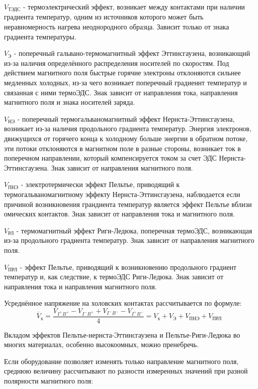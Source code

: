 $V_{\text{ТЭДС}}$ - термоэлектрический эффект, возникает между контактами при наличии градиента температур, одним из источников которого может быть неравномерность нагрева неоднородного образца. Зависит только от знака градиента температуры.

$V_{\text{Э}}$ - поперечный гальвано-термомагнитный эффект Эттинсгаузена, возникающий из-за наличия определённого распределения носителей по скоростям. Под действием магнитного поля быстрые горячие электроны отклоняются сильнее медленных холодных, из-за чего возникает поперечный градиеннт температур и связанная с ними термоЭДС. Знак зависит от направления тока, направления магнитного поля и знака носителей заряда.

$V_{\text{НЭ}}$ - поперечный термогальваномагнитный эффект Нернста-Эттинсгаузена, возникает из-за наличия продольного градиента температур. Энергия электронов, движущихся от горячего конца к холодному больше энергии в обратном потоке, эти потоки отклоняются в магнитном поле в разные стороны, возникает ток в поперечном направлении, который компенсируется током за счет ЭДС Нернста-Эттинсгаузена. Знак зависит от направления магнитного поля.

$V_{\text{ПНЭ}}$ - электротермически эффект Пельтье, приводящий к термогальваномагнитному эффекту Нернста-Эттинсгаузена, наблюдается если причиной возникновения грандиента температур является эффект Пельтье вблизи омических контактов. Знак зависит от направления тока и магнитного поля.

$V_{\text{РЛ}}$ - термомагнитный эффект Риги-Ледюка, поперечная термоЭДС, возникающая из-за продольного градиента температур. Знак зависит от направления магнитного поля.

$V_{\text{ПРЛ}}$ - эффект Пельтье, приводящий к возникновению продольного градиент температур и, как следствие, к термоЭДС Риги-Ледюка. Знак зависит от направления тока и направления магнитного поля.

Усреднённое напряжение на холовских контактах рассчитывается по формуле:
\begin{equation}
\overline{V}_{\text{х}} = \frac{V_{I^{+}B^{+}} - V_{I^{-}B^{+}} + V_{I^{-}B^{-}} - V_{I^{+}B^{-}}}{4} = V_{\text{х}} + V_{\text{Э}} + V_{\text{ПНЭ}} + V_{\text{ПРЛ}}
\end{equation}

Вкладом эффектов Пельтье-нернста-Эттинсгаузена и Пельтье-Риги-Ледюка во многих материалах, особенно высокоомных, можно пренебречь.

Если оборудование позволяет изменять только направление магнитного поля, среднюю величину рассчитывают по разности измеренных значений при разной полярности магнитного поля:

